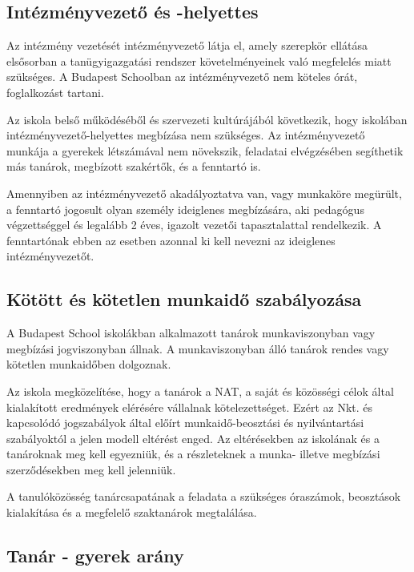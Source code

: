 \hypertarget{intezmenyvezeto-es--helyettes}{%
\subsection{Intézményvezető és
-helyettes}\label{intezmenyvezeto-es--helyettes}}

Az intézmény vezetését intézményvezető látja el, amely szerepkör
ellátása elsősorban a tanügyigazgatási rendszer követelményeinek való
megfelelés miatt szükséges. A Budapest Schoolban az intézményvezető nem
köteles órát, foglalkozást tartani.

Az iskola belső működéséből és szervezeti kultúrájából következik, hogy
iskolában intézményvezető-helyettes megbízása nem szükséges. Az
intézményvezető munkája a gyerekek létszámával nem növekszik, feladatai
elvégzésében segíthetik más tanárok, megbízott szakértők, és a fenntartó
is.

Amennyiben az intézményvezető akadályoztatva van, vagy munkaköre
megürült, a fenntartó jogosult olyan személy ideiglenes megbízására, aki
pedagógus végzettséggel és legalább 2 éves, igazolt vezetői
tapasztalattal rendelkezik. A fenntartónak ebben az esetben azonnal ki
kell nevezni az ideiglenes intézményvezetőt.

\hypertarget{kotott-es-kotetlen-munkaido-szabalyozasa}{%
\subsection{Kötött és kötetlen munkaidő
szabályozása}\label{kotott-es-kotetlen-munkaido-szabalyozasa}}

A Budapest School iskolákban alkalmazott tanárok munkaviszonyban vagy
megbízási jogviszonyban állnak. A munkaviszonyban álló tanárok rendes
vagy kötetlen munkaidőben dolgoznak.

Az iskola megközelítése, hogy a tanárok a NAT, a saját és közösségi
célok által kialakított eredmények elérésére vállalnak kötelezettséget.
Ezért az Nkt. és kapcsolódó jogszabályok által előírt munkaidő-beosztási
és nyilvántartási szabályoktól a jelen modell eltérést enged. Az
eltérésekben az iskolának és a tanároknak meg kell egyezniük, és a
részleteknek a munka- illetve megbízási szerződésekben meg kell
jelenniük.

A tanulóközösség tanárcsapatának a feladata a szükséges óraszámok,
beosztások kialakítása és a megfelelő szaktanárok megtalálása.

\hypertarget{tanar---gyerek-arany}{%
\subsection{Tanár - gyerek arány}\label{tanar---gyerek-arany}}


